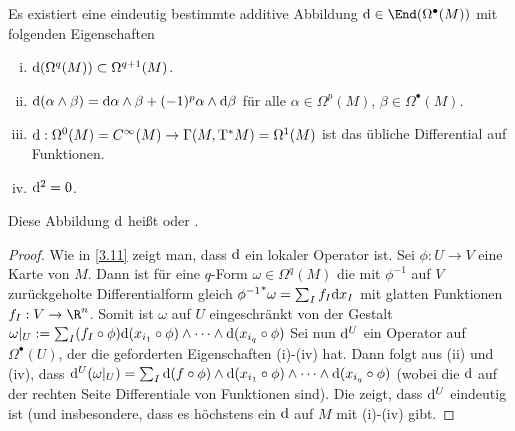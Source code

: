 \begin{st} \label{6.8}
    Es existiert eine eindeutig bestimmte additive Abbildung $\d \in \End(\Omega^\bullet(M))$ mit folgenden Eigenschaften
    \begin{enumerate}[i)]
        \item
            $\mathrm{d}(\Omega^q(M)) \subset \Omega^{q+1}(M)$.
        \item
            $\mathrm{d}(\alpha \wedge \beta) = \mathrm{d} \alpha \wedge \beta + (-1)^p \alpha \wedge \mathrm{d} \beta$ für alle $\alpha \in \Omega^p(M)$, $\beta \in \Omega^\bullet(M)$.
        \item
            $\mathrm{d}: \Omega^0(M) = C^\infty(M) \to \Gamma(M, \mathrm{T}^* M) = \Omega^1(M)$ ist das übliche Differential auf Funktionen.
        \item
            $\mathrm{d}^2 = 0$.
    \end{enumerate}
    Diese Abbildung $\mathrm{d}$ heißt  oder .
    \begin{proof}
        Wie in \ref{3.11} zeigt man, dass $\mathrm{d}$ ein lokaler Operator ist.
        Sei $\phi: U \to V$ eine Karte von $M$.
        Dann ist für eine $q$-Form $\omega \in \Omega^q(M)$ die mit $\phi^{-1}$ auf $V$ zurückgeholte Differentialform gleich ${\phi^{-1}}^* \omega = \sum_{I} f_I \mathrm{d} x_I$ mit glatten Funktionen $f_I: V \to \R^n$.
        Somit ist $\omega$ auf $U$ eingeschränkt von der Gestalt
        \begin{math}
            \omega|_U := \sum_I (f_I \circ \phi) \mathrm{d} (x_{i_1} \circ \phi) \wedge \dotsb \wedge \mathrm{d} (x_{i_q} \circ \phi)
        \end{math}
        Sei nun $\mathrm{d}^U$ ein Operator auf $\Omega^\bullet(U)$, der die geforderten Eigenschaften (i)-(iv) hat.
        Dann folgt aus (ii) und (iv), dass
        \begin{math}
            \mathrm{d}^U(\omega|_U)
            = \sum_{I} \mathrm{d}(f \circ \phi) \wedge \mathrm{d}(x_{i_1} \circ \phi) \wedge \dotsb \wedge \mathrm{d}(x_{i_q} \circ \phi)
        \end{math}
        (wobei die $\mathrm{d}$ auf der rechten Seite Differentiale von Funktionen sind).
        Die zeigt, dass $\mathrm{d}^U$ eindeutig ist (und insbesondere, dass es höchstens ein $\mathrm{d}$ auf $M$ mit (i)-(iv) gibt.


\end{proof}
\end{st}
